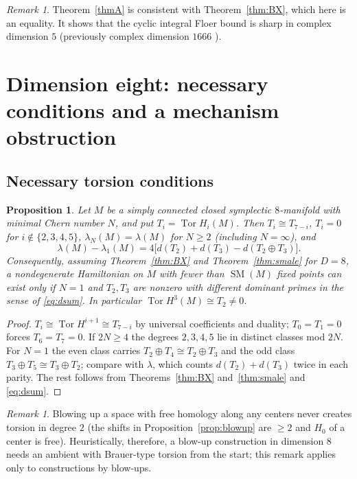 \documentclass[11pt]{amsart}
\numberwithin{equation}{section}
\newtheorem{proposition}[theorem]{Proposition}
\theoremstyle{definition}
\theoremstyle{remark}
\newtheorem{remark}[theorem]{Remark}
\DeclareMathOperator{\Tor}{Tor}
\DeclareMathOperator{\SM}{SM}
\begin{document}
\begin{remark}
Theorem~\ref{thmA} is consistent with Theorem~\ref{thm:BX}, which here is
an equality. It shows that the cyclic integral Floer bound is sharp in
complex dimension $5$ (previously complex dimension $1666$
\cite{OpenAICompanion}).
\end{remark}

\section{Dimension eight: necessary conditions and a mechanism obstruction}\label{sec:eight}

\subsection{Necessary torsion conditions}

\begin{proposition}\label{prop:nec8}
Let $M$ be a simply connected closed symplectic $8$-manifold with minimal
Chern number $N$, and put $T_i=\Tor H_i(M)$. Then $T_i\cong T_{7-i}$,
$T_i=0$ for $i\notin\{2,3,4,5\}$, $\lambda_N(M)=\lambda(M)$ for $N\ge2$
(including $N=\infty$), and
\[
  \lambda(M)-\lambda_1(M)=4\bigl[d(T_2)+d(T_3)-d(T_2\oplus T_3)\bigr].
\]
Consequently, assuming Theorem~\ref{thm:BX} and Theorem~\ref{thm:smale}
for $D=8$, a nondegenerate Hamiltonian on $M$ with fewer than $\SM(M)$
fixed points can exist only if $N=1$ and $T_2,T_3$ are nonzero with
different dominant primes in the sense of \eqref{eq:dsum}. In particular
$\Tor H^3(M)\cong T_2\ne0$.
\end{proposition}

\begin{proof}
$T_i\cong\Tor H^{i+1}\cong T_{7-i}$ by universal coefficients and duality;
$T_0=T_1=0$ forces $T_6=T_7=0$. If $2N\ge4$ the degrees $2,3,4,5$ lie in
distinct classes mod $2N$. For $N=1$ the even class carries
$T_2\oplus T_4\cong T_2\oplus T_3$ and the odd class
$T_3\oplus T_5\cong T_3\oplus T_2$; compare with $\lambda$, which counts
$d(T_2)+d(T_3)$ twice in each parity. The rest follows from
Theorems~\ref{thm:BX} and~\ref{thm:smale} and \eqref{eq:dsum}.
\end{proof}

\begin{remark}
Blowing up a space with free homology along any centers never creates
torsion in degree $2$ (the shifts in Proposition~\ref{prop:blowup} are
$\ge2$ and $H_0$ of a center is free). Heuristically, therefore, a
blow-up construction in dimension $8$ needs an ambient with Brauer-type
torsion from the start; this remark applies only to constructions by
blow-ups.
\end{remark}
\end{document}
